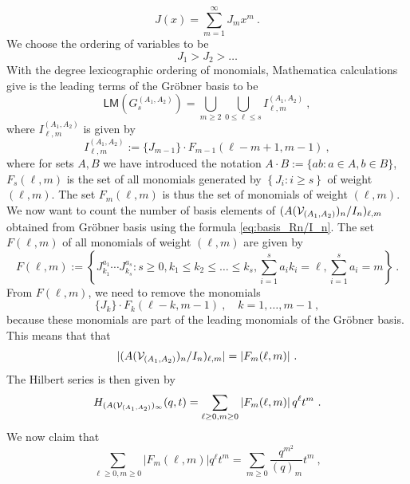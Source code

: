 \documentclass[a4paper,10pt]{article}
\newcommand{\mr}[1]{\mathsf{#1}}
\def\CV {{\cal V}}
\begin{document}
\begin{equation}
    J(x)=\sum_{m=1}^\infty J_mx^m~.
\end{equation}
We choose the ordering of variables to be
\begin{equation}
J_1>J_2>\dots
\end{equation}
With the degree lexicographic ordering of monomials, Mathematica calculations give is the leading terms of the Gr\"{o}bner basis to be
\begin{equation}
\mr{LM}\left(G_s^{\left(A_1, A_2\right)}\right)=\bigcup_{m \geq 2} \bigcup_{0 \leq \ell \leq s} I_{\ell, m}^{\left(A_1, A_2\right)}~,
\end{equation}
where $I_{\ell, m}^{\left(A_1, A_2\right)}$ is given by
\begin{equation}
I_{\ell, m}^{\left(A_1, A_2\right)}:=\{J_{m-1} \}\cdot F_{m-1}(\ell-m+1, m-1)~,
\end{equation}
where for sets $A,B$ we have introduced the notation $A\cdot B:=\{ab:a\in A,b\in B\}$, $F_s(\ell, m)$ is the set of all monomials generated by $\left\{J_i: i \geq s\right\}$ of weight $(\ell, m)$.
The set $F_m(\ell, m)$ is thus the set of monomials of weight $(\ell, m)$. We now want to count the number of basis elements of $(A(\CV_{(A_1,A_2)})_n/I_n)_{\ell,m}$ obtained from Gr\"{o}bner basis using the formula \eqref{eq:basis_Rn/I_n}. The set $F(\ell,m)$ of all monomials of weight $(\ell,m)$ are given by 
\begin{equation}
    F(\ell,m):=\left\{J_{k_1}^{a_1}\cdots J_{k_s}^{a_s}:s\geq 0,k_1\leq k_2\leq\dots\leq k_s,\sum_{i=1}^sa_ik_i=\ell,\sum_{i=1}^sa_i=m\right\}~.
\end{equation}
From $F(\ell,m)$, we need to remove the monomials
\begin{equation}
\{J_k\}\cdot F_k(\ell-k,m-1)~,\quad k=1,\dots,m-1~,    
\end{equation}
because these monomials are part of the leading monomials of the Gr\"{o}bner basis. This means that that 
\begin{equation}
|(A(\CV_{(A_1,A_2)})_n/I_n)_{\ell,m}|=|F_m(\ell,m)|~.    
\end{equation}
The Hilbert series is then given by
\begin{equation}
H_{(A(\CV_{(A_1,A_2)})_\infty}(q,t)=\sum_{\ell \geq 0, m \geq 0}\left|F_m(\ell, m)\right| q^\ell t^m~.
\end{equation}
We now claim that 
\begin{equation}
    \sum_{\ell \geq 0, m \geq 0}\left|F_m(\ell, m)\right| q^\ell t^m=\sum_{m \geq 0} \frac{q^{m^2}}{(q)_m} t^m~,
\end{equation}
\end{document}
